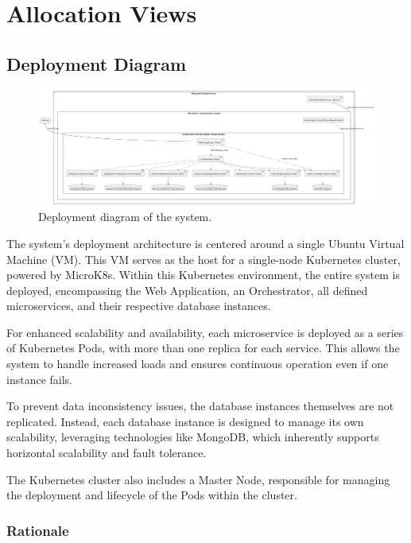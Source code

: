 \chapter{Allocation Views}

\section{Deployment Diagram}

\begin{figure}[h]
    \centering
    \includegraphics[width=0.9\linewidth]{Architettura/imgs/deploymentview.pdf}
    \caption{Deployment diagram of the system.}
    \label{fig:deploymentViewGlobal}
\end{figure}

\begin{justify}
    The system's deployment architecture is centered around a single Ubuntu Virtual Machine (VM). This VM serves as the host for a single-node Kubernetes cluster, powered by MicroK8s. Within this Kubernetes environment, the entire system is deployed, encompassing the Web Application, an Orchestrator, all defined microservices, and their respective database instances.

    For enhanced scalability and availability, each microservice is deployed as a series of Kubernetes Pods, with more than one replica for each service. This allows the system to handle increased loads and ensures continuous operation even if one instance fails.

    To prevent data inconsistency issues, the database instances themselves are not replicated. Instead, each database instance is designed to manage its own scalability, leveraging technologies like MongoDB, which inherently supports horizontal scalability and fault tolerance. 
    
    The Kubernetes cluster also includes a Master Node, responsible for managing the deployment and lifecycle of the Pods within the cluster.
\end{justify}


\subsection{Rationale}

